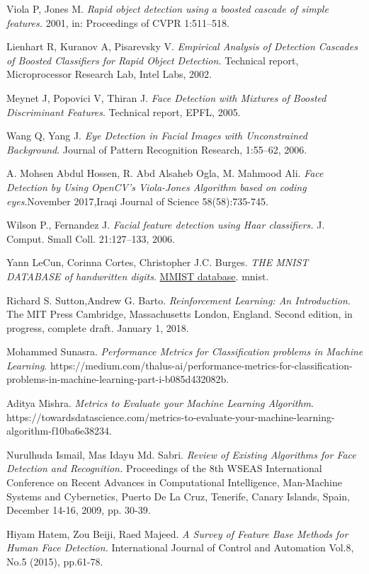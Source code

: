 \documentclass{article}
\begin{document}
\begin{thebibliography}{1}
    Viola P, Jones M. \textit{Rapid object detection using a boosted cascade of simple features.} 2001, in: Proceedings of CVPR 1:511–518.
    
    Lienhart R, Kuranov A, Pisarevsky V. \textit{Empirical Analysis of Detection Cascades of Boosted Classifiers for Rapid Object Detection.} Technical report, Microprocessor Research Lab, Intel Labs, 2002.
    
    Meynet J, Popovici V, Thiran J. \textit{Face Detection with Mixtures of Boosted Discriminant Features}. Technical report, EPFL, 2005.
    
    Wang Q, Yang J. \textit{Eye Detection in Facial Images with Unconstrained Background}. Journal of Pattern Recognition Research, 1:55–62, 2006.
    
    A. Mohsen Abdul Hossen, R. Abd Alsaheb Ogla, M. Mahmood Ali. \textit{Face Detection by Using OpenCV's Viola-Jones Algorithm based on coding eyes}.November 2017,Iraqi Journal of Science 58(58):735-745.
    
    Wilson P., Fernandez J. \textit{Facial feature detection using Haar classifiers.} J. Comput. Small Coll. 21:127–133, 2006.
 
    Yann LeCun, Corinna Cortes, Christopher J.C. Burges. \textit{THE MNIST DATABASE of handwritten digits}.
    \href{http://yann.lecun.com/exdb/mnist/}{MMIST  database}. mnist.
    
    Richard S. Sutton,Andrew G. Barto. \textit{Reinforcement Learning: An Introduction}. The MIT Press Cambridge, Massachusetts London, England. Second edition, in progress, complete draft. January 1, 2018.
    
    Mohammed Sunasra. \textit{Performance Metrics for Classification problems in Machine Learning}. https://medium.com/thalus-ai/performance-metrics-for-classification-problems-in-machine-learning-part-i-b085d432082b.
    
    Aditya Mishra. \textit{Metrics to Evaluate your Machine Learning Algorithm}. https://towardsdatascience.com/metrics-to-evaluate-your-machine-learning-algorithm-f10ba6e38234.
    
    Nurulhuda Ismail, Mas Idayu Md. Sabri. \textit{Review  of  Existing  Algorithms  for  Face  Detection  and  Recognition.} Proceedings of the 8th WSEAS International Conference on  Recent Advances in Computational  Intelligence, Man-Machine Systems and Cybernetics, Puerto De La Cruz, Tenerife, Canary Islands,  Spain, December 14-16, 2009, pp. 30-39.
    
    Hiyam Hatem, Zou Beiji, Raed Majeed. \textit{A Survey of Feature Base Methods for Human Face Detection.} International Journal of Control and Automation Vol.8, No.5 (2015), pp.61-78.
\end{thebibliography}
\end{document}
